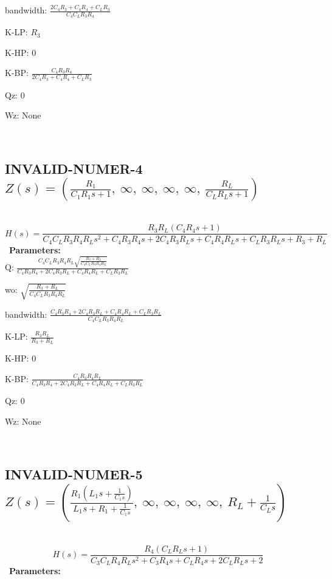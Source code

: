 \documentclass{article}
\begin{document}
bandwidth: $\frac{2 C_{4} R_{3} + C_{4} R_{4} + C_{L} R_{3}}{C_{4} C_{L} R_{3} R_{4}}$\ 

K-LP: $R_{3}$\ 

K-HP: $0$\ 

K-BP: $\frac{C_{4} R_{3} R_{4}}{2 C_{4} R_{3} + C_{4} R_{4} + C_{L} R_{3}}$\ 

Qz: $0$\ 

Wz: $\text{None}$\ 

\ 

\subsection{INVALID-NUMER-4 $Z(s) = \left( \frac{R_{1}}{C_{1} R_{1} s + 1}, \  \infty, \  \infty, \  \infty, \  \infty, \  \frac{R_{L}}{C_{L} R_{L} s + 1}\right)$ } \ 
\textbf{\[H(s) = \frac{R_{3} R_{L} \left(C_{4} R_{4} s + 1\right)}{C_{4} C_{L} R_{3} R_{4} R_{L} s^{2} + C_{4} R_{3} R_{4} s + 2 C_{4} R_{3} R_{L} s + C_{4} R_{4} R_{L} s + C_{L} R_{3} R_{L} s + R_{3} + R_{L}}\] } \ 
\textbf{Parameters:}\\ 

Q: $\frac{C_{4} C_{L} R_{3} R_{4} R_{L} \sqrt{\frac{R_{3} + R_{L}}{C_{4} C_{L} R_{3} R_{4} R_{L}}}}{C_{4} R_{3} R_{4} + 2 C_{4} R_{3} R_{L} + C_{4} R_{4} R_{L} + C_{L} R_{3} R_{L}}$\ 

wo: $\sqrt{\frac{R_{3} + R_{L}}{C_{4} C_{L} R_{3} R_{4} R_{L}}}$\ 

bandwidth: $\frac{C_{4} R_{3} R_{4} + 2 C_{4} R_{3} R_{L} + C_{4} R_{4} R_{L} + C_{L} R_{3} R_{L}}{C_{4} C_{L} R_{3} R_{4} R_{L}}$\ 

K-LP: $\frac{R_{3} R_{L}}{R_{3} + R_{L}}$\ 

K-HP: $0$\ 

K-BP: $\frac{C_{4} R_{3} R_{4} R_{L}}{C_{4} R_{3} R_{4} + 2 C_{4} R_{3} R_{L} + C_{4} R_{4} R_{L} + C_{L} R_{3} R_{L}}$\ 

Qz: $0$\ 

Wz: $\text{None}$\ 

\ 

\subsection{INVALID-NUMER-5 $Z(s) = \left( \frac{R_{1} \left(L_{1} s + \frac{1}{C_{1} s}\right)}{L_{1} s + R_{1} + \frac{1}{C_{1} s}}, \  \infty, \  \infty, \  \infty, \  \infty, \  R_{L} + \frac{1}{C_{L} s}\right)$ } \ 
\textbf{\[H(s) = \frac{R_{4} \left(C_{L} R_{L} s + 1\right)}{C_{3} C_{L} R_{4} R_{L} s^{2} + C_{3} R_{4} s + C_{L} R_{4} s + 2 C_{L} R_{L} s + 2}\] } \ 
\textbf{Parameters:}\\ 
\end{document}
